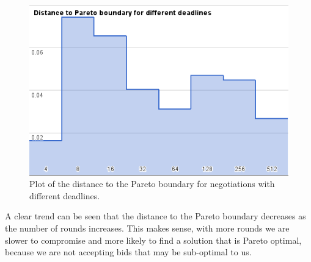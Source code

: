 \documentclass[a4,11pt]{scrartcl}
\begin{document}
\begin{figure}[t]
    \includegraphics[width=\textwidth]{paretodeadlines.png}
    \caption{Plot of the distance to the Pareto boundary for negotiations
    with different deadlines.}
    \label{paretodeadlines}
\end{figure}

A clear trend can be seen that the distance to the Pareto boundary
decreases as the number of rounds increases. This makes sense, with more
rounds we are slower to compromise and more likely to find a solution
that is Pareto optimal, because we are not accepting bids that may be
sub-optimal to us.


\newpage
\end{document}
